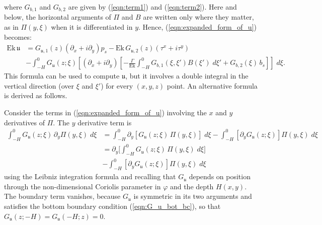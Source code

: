 \documentclass{ametsocV6.2}
\begin{document}
where $G_{b,1}$ and $G_{b,2}$ are given by (\ref{eqn:term1}) and (\ref{eqn:term2}). Here and below, the horizontal arguments of $\Pi$ and $B$ are written only where they matter, as in $\Pi(y, \xi)$ when it is differentiated in $y$.
Hence, (\ref{eqn:expanded_form_of_u}) becomes:
\begin{align}
\mathrm{Ek} \, \mathfrak{u}
& = G_{\mathfrak{u},1}(z) \left(\partial_x  + i \partial_y \right) p_s  - \mathrm{Ek} \, G_{\mathfrak{u},2} (z)  \left( \tau^x + i \tau^y \right) \nonumber \\
& - \int_{-H}^{0} G_{ \mathfrak{u}} (z; \xi) \left[ \left(\partial_x  + i \partial_y \right)  \left[ - \frac{\Gamma}{\mathrm{Ek}} \int_{-H}^{0} G_{b,1}(\xi,\xi') B(\xi') \; d \xi'  + G_{b,2} (\xi)  \, b_s \right] \right] \; d \xi  .
\label{eqn:final_velocity_formula1}
\end{align}
This formula can be used to compute $\mathfrak{u}$, but it involves a double integral in the vertical direction (over $\xi$ and $\xi'$) for every $(x,y,z)$ point.
An alternative formula is derived as follows.

Consider the terms in (\ref{eqn:expanded_form_of_u}) involving the $x$ and $y$ derivatives of $\Pi$.
The $y$ derivative term is
\begin{align}
    \int_{-H}^{0} G_{ \mathfrak{u}} ( z; \xi) \, \partial_y \Pi (y, \xi) \; d \xi  & = 
    \int_{-H}^{0} \partial_y \left[ G_{ \mathfrak{u}} ( z; \xi) \, \Pi (y, \xi)  \right] \; d \xi   -
    \int_{-H}^{0} \left[ \partial_y G_{ \mathfrak{u}} ( z; \xi) \right] \Pi (y, \xi) \; d \xi  \nonumber \\
& =   
    \partial_y \bigg[ \int_{-H}^{0} G_{ \mathfrak{u}} ( z; \xi) \, \Pi (y, \xi) \; d \xi \bigg] \nonumber \\
    & - \int_{-H}^{0} \left[ \partial_y G_{ \mathfrak{u}} ( z; \xi) \right] \Pi (y, \xi) \; d \xi
    \label{eqn:Pi_y_derivative}
\end{align}
using the Leibniz integration formula and recalling that $G_{ \mathfrak{u}}$ depends on position through the non-dimensional Coriolis parameter in $\varphi$ and the depth $H(x,y)$. The boundary term vanishes, because $G_{\mathfrak{u}}$ is symmetric in its two arguments and satisfies the bottom boundary condition (\ref{eqn:G_u_bot_bc}), so that $G_{\mathfrak{u}}(z; -H) = G_{\mathfrak{u}}(-H; z) = 0$.
\end{document}
